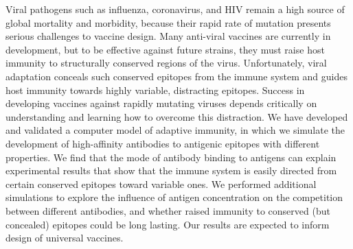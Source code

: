 %
 Viral pathogens such as influenza, coronavirus, and HIV remain a high
 source of global mortality and morbidity, because their rapid rate of
 mutation presents serious challenges to vaccine design.
%
 Many anti-viral vaccines are currently in development, but to be
 effective against future strains, they must raise host immunity to
 structurally conserved regions of the virus. Unfortunately, viral
 adaptation conceals such conserved epitopes from the immune system and
 guides host immunity towards highly variable, distracting epitopes.
 Success in developing vaccines against rapidly mutating viruses depends
 critically on understanding and learning how to overcome this distraction.
%
 We have developed and validated a computer model of adaptive
 immunity, in which we simulate the development of high-affinity
 antibodies to antigenic epitopes with different properties. 
%
 We find that the mode of antibody binding to antigens can explain
 experimental results that show that the immune system is easily
 directed from certain conserved epitopes toward variable ones.  We
 performed additional simulations to explore the influence of antigen
 concentration on the competition between different antibodies, and
 whether raised immunity to conserved (but concealed) epitopes could be
 long lasting. Our results are expected to inform design of universal vaccines.
